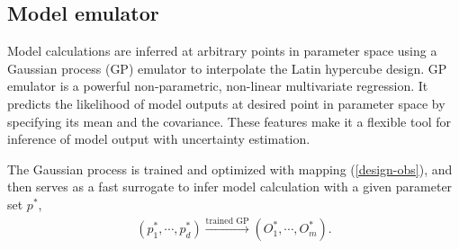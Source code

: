 \documentclass[aps,prl,twocolumn,groupedaddress]{revtex4-1}
\begin{document}
	\subsection{Model emulator}
	Model calculations are inferred at arbitrary points in parameter space using a Gaussian process (GP) emulator to interpolate the Latin hypercube design. 
	GP emulator is a powerful non-parametric, non-linear multivariate regression. 
	It predicts the likelihood of model outputs at desired point in parameter space by specifying its mean and the covariance.
	These features make it a flexible tool for inference of model output with uncertainty estimation.
	
	 The Gaussian process is trained and optimized with mapping (\ref{design-obs}), and then serves as a fast surrogate to infer model calculation with a given parameter set $p^*$,
	 \begin{eqnarray}
	 	(p^*_1, \cdots, p^*_d) \xrightarrow{\textrm{trained GP}} (O^*_1, \cdots, O^*_m).
	 \end{eqnarray}
	 
\end{document}
